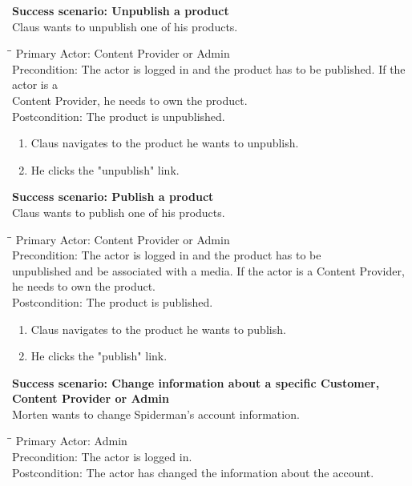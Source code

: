 \textbf{Success scenario: Unpublish a product} \\
Claus wants to unpublish one of his products.
\begin{tabbing}
\hspace{5mm}\=\hspace{26mm}\=\kill
\>Primary Actor:\> Content Provider or Admin\\
\>Precondition:\> The actor is logged in and the product has to be published. If the actor is a\\ \hspace{85px} Content Provider, he needs to own the product.\\
\>Postcondition:\> The product is unpublished.
\end{tabbing}
\begin{enumerate} \setlength{\itemsep}{-1mm}
	\item Claus navigates to the product he wants to unpublish.
	\item He clicks the "unpublish" link.
\end{enumerate}
\vspace{3mm}
\textbf{Success scenario: Publish a product} \\
Claus wants to publish one of his products.
\begin{tabbing}
\hspace{5mm}\=\hspace{26mm}\=\kill
\>Primary Actor:\> Content Provider or Admin\\
\>Precondition:\> The actor is logged in and the product has to be\\ \hspace{85px} unpublished and be associated with a media. If the actor is a Content Provider, he needs to own the product.\\
\>Postcondition:\> The product is published.
\end{tabbing}
\begin{enumerate} \setlength{\itemsep}{-1mm}
	\item Claus navigates to the product he wants to publish.
	\item He clicks the "publish" link.
\end{enumerate}
\vspace{3mm}
\textbf{Success scenario: Change information about a specific Customer, Content Provider or Admin} \\
Morten wants to change Spiderman's account information.
\begin{tabbing}
\hspace{5mm}\=\hspace{26mm}\=\kill
\>Primary Actor:\> Admin\\
\>Precondition:\> The actor is logged in.\\
\>Postcondition:\> The actor has changed the information about the account.
\end{tabbing}
